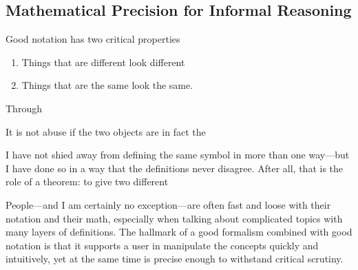 

\subsection{Mathematical Precision for Informal Reasoning}

Good notation has two critical properties
\begin{enumerate}
    \item Things that are different look different
    \item Things that are the same look the same. 
\end{enumerate}
Through 

It is not abuse if the two objects are in fact the 

I have not shied away from defining the same symbol in more than one way---but I have done so in a way that the definitions never disagree.
After all, that is the role of a theorem: to give two different 


\TODO


People---and I am certainly no exception---are often fast and loose with their notation and their math, especially when talking about complicated topics with many layers of definitions. 
%
The hallmark of a good formalism combined with good notation is that it supports a user in manipulate the concepts quickly and intuitively, yet at the same time is precise enough to withstand critical scrutiny.
    
